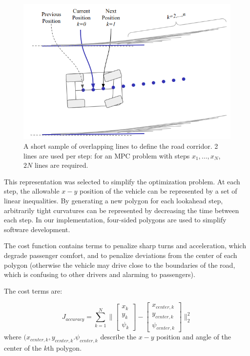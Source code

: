 \documentclass[conference]{IEEEtran}
\begin{document}
\begin{figure}[h]
	\centering
	\includegraphics[width=0.9\linewidth]{road_final_bounds.png}
	\caption{A short sample of overlapping lines to define the road corridor. 2 lines are used per step: for an MPC problem with steps $x_1,\dots,x_N$, $2N$ lines are required.}
	\label{fig:roadpolygons}
\end{figure}

This representation was selected to simplify the optimization problem. At each step, the allowable $x-y$ position of the vehicle can be represented by a set of linear inequalities. By generating a new polygon for each lookahead step, arbitrarily tight curvatures can be represented by decreasing the time between each step. In our implementation, four-sided polygons are used to simplify software development.

The cost function contains terms to penalize sharp turns and acceleration, which degrade passenger comfort, and to penalize deviations from the center of each polygon (otherwise the vehicle may drive close to the boundaries of the road, which is confusing to other drivers and alarming to passengers).

The cost terms are:

\begin{equation}
J_{accuracy} = \sum_{k=1}^N\big\| \begin{bmatrix}
x_k\\y_k\\\psi_k
\end{bmatrix} - \begin{bmatrix}
x_{center,k}\\y_{center,k}\\\psi_{center,k}
\end{bmatrix} \big\|_2^2
\label{eq:costcenter}
\end{equation}
where $(x_{center,k}, y_{center,k}. \psi_{center,k}$ describe the $x-y$ position and angle of the center of the $k$th polygon.
\end{document}
